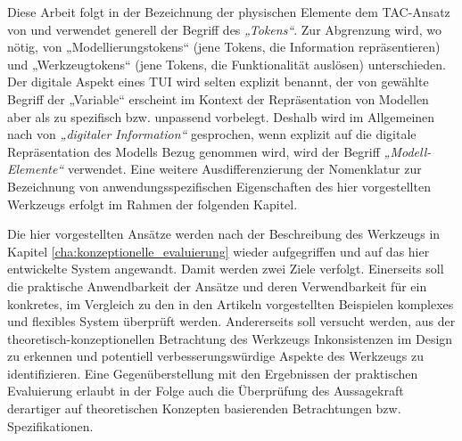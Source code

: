% 	

Diese Arbeit folgt in der Bezeichnung der physischen Elemente dem TAC-Ansatz von \citep{Shaer04} und verwendet generell der Begriff des \emph{„Tokens“}. Zur Abgrenzung wird, wo nötig, von „Modellierungstokens“ (jene Tokens, die Information repräsentieren) und „Werkzeugtokens“ (jene Tokens, die Funktionalität auslösen) unterschieden. Der digitale Aspekt eines \gls{TUI} wird selten explizit benannt, der von \citep{Shaer04} gewählte Begriff der „Variable“ erscheint im Kontext der Repräsentation von Modellen aber als zu spezifisch bzw. unpassend vorbelegt. Deshalb wird im Allgemeinen nach \citep{Ishii08} von \emph{„digitaler Information“} gesprochen, wenn explizit auf die digitale Repräsentation des Modells Bezug genommen wird, wird der Begriff \emph{„Modell-Elemente“} verwendet. Eine weitere Ausdifferenzierung der Nomenklatur zur Bezeichnung von anwendungsspezifischen Eigenschaften des hier vorgestellten Werkzeugs erfolgt im Rahmen der folgenden Kapitel.

Die hier vorgestellten Ansätze werden nach der Beschreibung des Werkzeugs in Kapitel \ref{cha:konzeptionelle_evaluierung} wieder aufgegriffen und auf das hier entwickelte System angewandt. Damit werden zwei Ziele verfolgt. Einerseits soll die praktische Anwendbarkeit der Ansätze und deren Verwendbarkeit für ein konkretes, im Vergleich zu den in den Artikeln vorgestellten Beispielen komplexes und flexibles System überprüft werden. Andererseits soll versucht werden, aus der theoretisch-konzeptionellen Betrachtung des Werkzeugs Inkonsistenzen im Design zu erkennen und potentiell verbesserungswürdige Aspekte des Werkzeugs zu identifizieren. Eine Gegenüberstellung mit den Ergebnissen der praktischen Evaluierung erlaubt in der Folge auch die Überprüfung des Aussagekraft derartiger auf theoretischen Konzepten basierenden Betrachtungen bzw. Spezifikationen.


